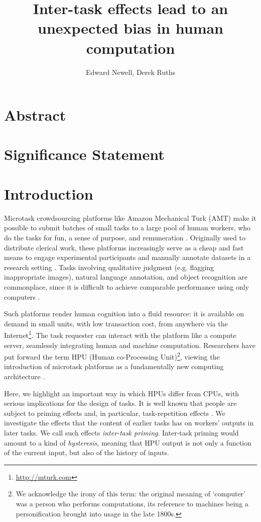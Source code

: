 \documentclass[a4paper]{report}
\title{Inter-task effects lead to an unexpected bias in human computation}
\author{Edward Newell, Derek Ruths}
\begin{document}
\maketitle
\section*{Abstract}
\section*{Significance Statement}
\section*{Introduction}

Microtask crowdsourcing platforms like Amazon Mechanical Turk (AMT) make it 
possible to submit batches of small tasks to a large pool of human workers, 
who do the tasks for fun, a sense of purpose, and remuneration 
\cite{kazai2013analysis, Antin20122925}.  
Originally used to distribute clerical work, these platforms 
increasingly serve as a cheap and fast means to engage experimental 
participants and manually annotate datasets in a research 
setting \cite{snow2008cheap}.  
Tasks involving qualitative
judgment (e.g. flagging inappropriate images), natural language annotation,
and object recognition are commonplace, since it is difficult to achieve 
comparable performance using only computers \cite{yuen2011survey}.

Such platforms render human cognition into a fluid resource: it is available 
on demand in small units, with low transaction 
cost, from anywhere via the 
Internet\footnote{\href{http://mturk.com}{http://mturk.com}}.
The task requester can 
interact with the platform like a compute server, seamlessly 
integrating human and machine computation.  Researchers have put forward the 
term HPU (Human co-Processing Unit)\footnote{We acknowledge the irony of this 
term: the original meaning of `computer' was a person who performs 
computations, its reference to machines being a personification brought into 
usage in the late 1800s\cite{Dictionary:hl}.}, viewing the introduction of 
microtask platforms as a fundamentally new computing architecture
\cite{5543192}.  

Here, we highlight an important way in which HPUs differ from CPUs, with 
serious implications for the design of tasks.  It is well known that people 
are subject to priming effects 
\cite{BJOP:BJOP1796, No2007, beller1971priming} and, in particular, task-repetition effects
\cite{Gass1999549, sohn2001task}.  
We investigate the effects that the content of earlier tasks has on workers'
outputs in later tasks.  We call such effects 
\textit{inter-task priming}.  Inter-task priming would amount to a kind of
\textit{hysteresis}, meaning that HPU output is not only a function of the 
current input, but also of the history of inputs.
\end{document}
